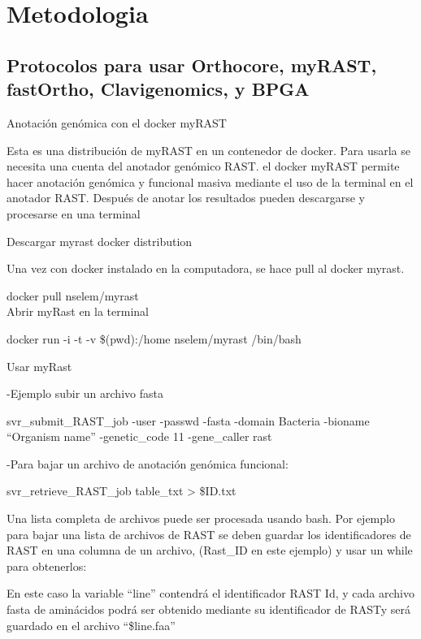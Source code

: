 \documentclass[12pt,twoside]{reedthesis}
\begin{document}
{  \chapter*{Metodologia}\label{metodologia-1}
  
  \setcounter{chapter}{4} \setcounter{section}{0}
  
  \section{Protocolos para usar Orthocore, myRAST, fastOrtho,
  Clavigenomics, y
  BPGA}\label{protocolos-para-usar-orthocore-myrast-fastortho-clavigenomics-y-bpga}
  
  Anotación genómica con el docker myRAST
  
  Esta es una distribución de myRAST en un contenedor de docker. Para
  usarla se necesita una cuenta del anotador genómico RAST. el docker
  myRAST permite hacer anotación genómica y funcional masiva mediante el
  uso de la terminal en el anotador RAST. Después de anotar los resultados
  pueden descargarse y procesarse en una terminal
  
  Descargar myrast docker distribution
  
  Una vez con docker instalado en la computadora, se hace pull al docker
  myrast.
  
  docker pull nselem/myrast\\
  Abrir myRast en la terminal
  
  docker run -i -t -v \$(pwd):/home nselem/myrast /bin/bash
  
  Usar myRast
  
  -Ejemplo subir un archivo fasta
  
  svr\_submit\_RAST\_job -user -passwd -fasta -domain Bacteria -bioname
  ``Organism name'' -genetic\_code 11 -gene\_caller rast
  
  -Para bajar un archivo de anotación genómica funcional:
  
  svr\_retrieve\_RAST\_job table\_txt \textgreater{} \$ID.txt
  
  Una lista completa de archivos puede ser procesada usando bash. Por
  ejemplo para bajar una lista de archivos de RAST se deben guardar los
  identificadores de RAST en una columna de un archivo, (Rast\_ID en este
  ejemplo) y usar un while para obtenerlos:
  
  En este caso la variable ``line'' contendrá el identificador RAST Id, y
  cada archivo fasta de aminácidos podrá ser obtenido mediante su
  identificador de RASTy será guardado en el archivo ``\$line.faa''
  
}
\end{document}
